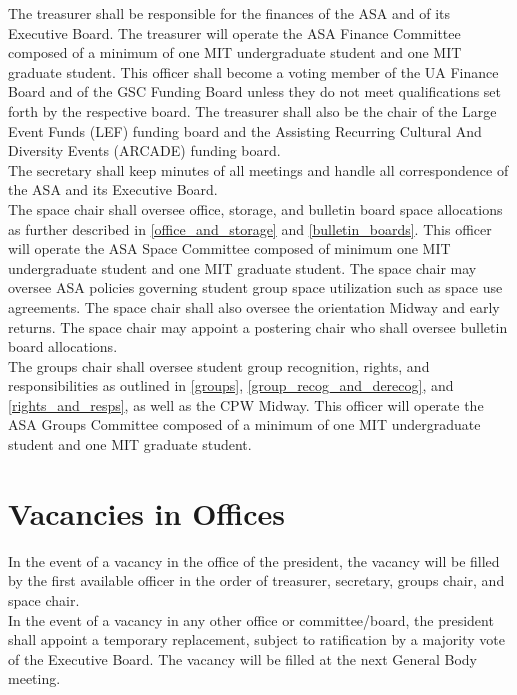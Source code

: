 \documentclass[12pt]{constitution}
\begin{document}
The treasurer shall be responsible for the finances of the ASA and of its Executive Board.
The treasurer will operate the ASA Finance Committee composed of a minimum of one MIT undergraduate student
    and one MIT graduate student.
This officer shall become a voting member of the UA Finance Board and of the GSC Funding Board unless
    they do not meet qualifications set forth by the respective board.
The treasurer shall also be the chair of the Large Event Funds (LEF) funding board and the Assisting
    Recurring Cultural And Diversity Events (ARCADE) funding board.
\\

The secretary shall keep minutes of all meetings and handle all correspondence of the ASA and its Executive Board.
\\

The space chair shall oversee office, storage, and bulletin board space allocations as further described
    in \ref{office_and_storage} and \ref{bulletin_boards}.
This officer will operate the ASA Space Committee composed of minimum one MIT undergraduate student and one
    MIT graduate student.
The space chair may oversee ASA policies governing student group space utilization such as space use agreements.
The space chair shall also oversee the orientation Midway and early returns.
The space chair may appoint a postering chair who shall oversee bulletin board allocations.
\\

The groups chair shall oversee student group recognition, rights, and responsibilities as outlined in
    \ref{groups}, \ref{group_recog_and_derecog}, and \ref{rights_and_resps}, as well as the CPW Midway.
This officer will operate the ASA Groups Committee composed of a minimum of one MIT undergraduate student and one
    MIT graduate student.

\section{Vacancies in Offices}
\label{asa_exec_vacancies}
In the event of a vacancy in the office of the president, the vacancy will be filled by the first available
    officer in the order of treasurer, secretary, groups chair, and space chair.
\\

In the event of a vacancy in any other office or committee/board, the president shall appoint a
    temporary replacement, subject to ratification by a majority vote of the Executive Board.
The vacancy will be filled at the next General Body meeting.
\end{document}

